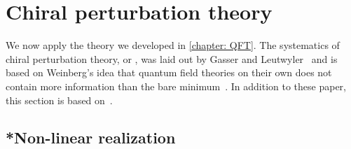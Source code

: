 \section{Chiral perturbation theory}
\label{section: chiral perturbation theory}

We now apply the theory we developed in \autoref{chapter: QFT}.
The systematics of chiral perturbation theory, or \chpt, was laid out by Gasser and Leutwyler~\autocite{gasserChiralPerturbationTheory1984,gasserChiralPerturbationTheory1985} and is based on Weinberg's idea that quantum field theories on their own does not contain more information than the bare minimum~\autocite{weinbergPhenomenologicalLagrangians1979}.
In addition to these paper, this section is based on~\autocite{eckerChiralPerturbationTheory1995,fearingExtensionChiralPerturbation1996,schererIntroductionChiralPerturbation2002}.


\subsection{*Non-linear realization}

